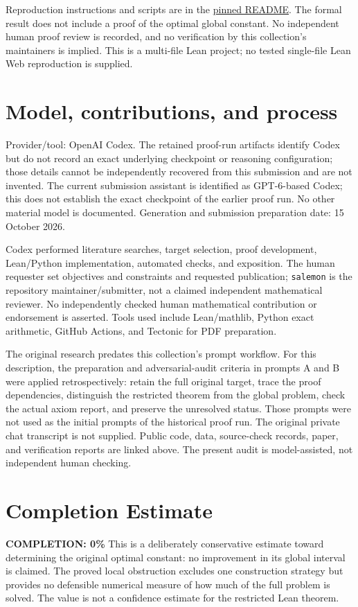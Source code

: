 \documentclass[11pt]{article}
\begin{document}
Reproduction instructions and scripts are in the
\href{https://github.com/salemon/erdos-242/blob/ca3f08715aeffb98581410a67bff9d02fb9ecbfe/README.md}{pinned README}.
The formal result does not include a proof of the optimal global constant.
No independent human proof review is recorded, and no verification by this
collection's maintainers is implied. This is a multi-file Lean project;
no tested single-file Lean Web reproduction is supplied.

\section{Model, contributions, and process}
Provider/tool: OpenAI Codex. The retained proof-run artifacts identify Codex
but do not record an exact underlying checkpoint or reasoning configuration;
those details cannot be independently recovered from this submission and are
not invented. The current submission assistant is identified as GPT-6-based
Codex; this does not establish the exact checkpoint of the earlier proof run.
No other material model is documented. Generation and submission preparation
date: 15 October 2026.

Codex performed literature searches, target selection, proof development,
Lean/Python implementation, automated checks, and exposition. The human
requester set objectives and constraints and requested publication;
\texttt{salemon} is the repository maintainer/submitter, not a claimed
independent mathematical reviewer. No independently checked human mathematical
contribution or endorsement is asserted. Tools used include Lean/mathlib,
Python exact arithmetic, GitHub Actions, and Tectonic for PDF preparation.

The original research predates this collection's prompt workflow. For this
description, the preparation and adversarial-audit criteria in prompts A and B
were applied retrospectively: retain the full original target, trace the proof
dependencies, distinguish the restricted theorem from the global problem,
check the actual axiom report, and preserve the unresolved status. Those prompts
were not used as the initial prompts of the historical proof run.
The original private chat transcript is not supplied. Public code, data,
source-check records, paper, and verification reports are linked above.
The present audit is model-assisted, not independent human checking.

\section{Completion Estimate}
\noindent\textbf{COMPLETION: 0\%}
This is a deliberately conservative estimate toward determining the original
optimal constant: no improvement in its global interval is claimed.
The proved local obstruction excludes one construction strategy but provides
no defensible numerical measure of how much of the full problem is solved.
The value is not a confidence estimate for the restricted Lean theorem.
\end{document}
